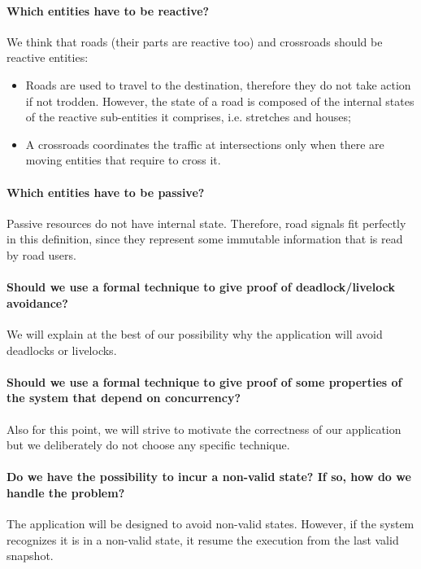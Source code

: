 \paragraph{Which entities have to be reactive?} We think that roads
(their parts are reactive too) and crossroads should be reactive entities:
\begin{itemize}
  \item Roads are used to travel to the destination, therefore they do not take
    action if not trodden. However, the state of a road is composed of the
    internal states of the reactive sub-entities it comprises, i.e. stretches
    and houses;
  \item A crossroads coordinates the traffic at intersections only when there
    are moving entities that require to cross it.
\end{itemize}

\paragraph{Which entities have to be passive?} Passive resources do not have
internal state. Therefore, road signals fit perfectly in this definition, since
they represent some immutable information that is read by road users.

\paragraph{Should we use a formal technique to give proof of deadlock/livelock
avoidance?} We will explain at the best of our possibility why the application
will avoid deadlocks or livelocks.

\paragraph{Should we use a formal technique to give proof of some properties of
the system that depend on concurrency?} Also for this point, we will strive to
motivate the correctness of our application but we deliberately do not choose
any specific technique.

\paragraph{Do we have the possibility to incur a non-valid state? If so, how do
we handle the problem?} The application will be designed to avoid non-valid
states. However, if the system recognizes it is in a non-valid state, it resume
the execution from the last valid snapshot.

